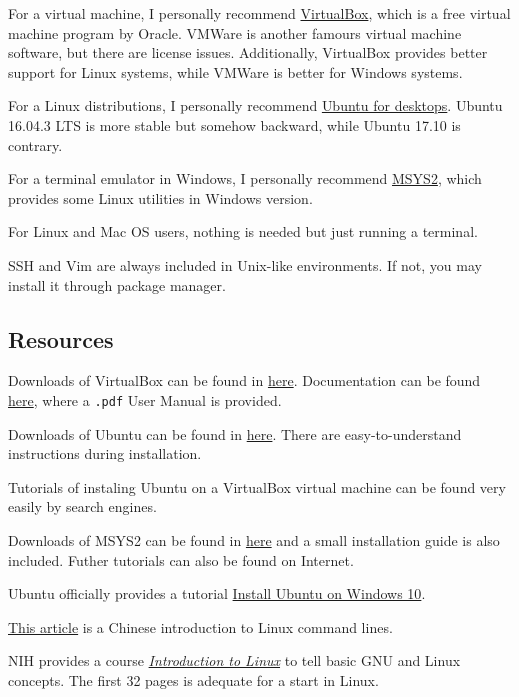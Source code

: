 \documentclass[english]{pkupaper}
\begin{document}
For a virtual machine, I personally recommend \href{https://www.virtualbox.org/}{VirtualBox}, which is a free virtual machine program by Oracle. VMWare is another famours virtual machine software, but there are license issues. Additionally, VirtualBox provides better support for Linux systems, while VMWare is better for Windows systems.

For a Linux distributions, I personally recommend \href{https://www.ubuntu.com/desktop}{Ubuntu for desktops}. Ubuntu 16.04.3 LTS is more stable but somehow backward, while Ubuntu 17.10 is contrary.

For a terminal emulator in Windows, I personally recommend \href{http://www.msys2.org/}{MSYS2}, which provides some Linux utilities in Windows version.

For Linux and Mac OS users, nothing is needed but just running a terminal.

SSH and Vim are always included in Unix-like environments. If not, you may install it through package manager.

\subsection{Resources}

Downloads of VirtualBox can be found in \href{https://www.virtualbox.org/wiki/Downloads}{here}. Documentation can be found \href{https://www.virtualbox.org/wiki/Documentation}{here}, where a \verb".pdf" User Manual is provided.

Downloads of Ubuntu can be found in \href{https://www.ubuntu.com/download/desktop}{here}. There are easy-to-understand instructions during installation.

Tutorials of instaling Ubuntu on a VirtualBox virtual machine can be found very easily by search engines.

Downloads of MSYS2 can be found in \href{http://www.msys2.org/}{here} and a small installation guide is also included. Futher tutorials can also be found on Internet.

Ubuntu officially provides a tutorial \href{https://tutorials.ubuntu.com/tutorial/tutorial-ubuntu-on-windows}{Install Ubuntu on Windows 10}.

\href{https://linux.cn/article-6160-1.html}{This article} is a Chinese introduction to Linux command lines.

NIH provides a course \href{https://hpc.nih.gov/training/handouts/Linux_NIH_2017.pdf}{\emph{Introduction to Linux}} to tell basic GNU and Linux concepts. The first 32 pages is adequate for a start in Linux.
\end{document}

